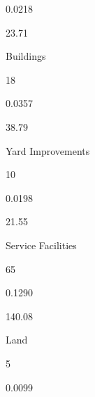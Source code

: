\documentclass[a4paper,portrait,12pt]{article}
\begin{document}
0.0218





23.71





\begin{flushleft}
Buildings
\end{flushleft}





18





0.0357





38.79





\begin{flushleft}
Yard Improvements
\end{flushleft}





10





0.0198





21.55





\begin{flushleft}
Service Facilities
\end{flushleft}





65





0.1290





140.08





\begin{flushleft}
Land
\end{flushleft}





5





0.0099
\end{document}
